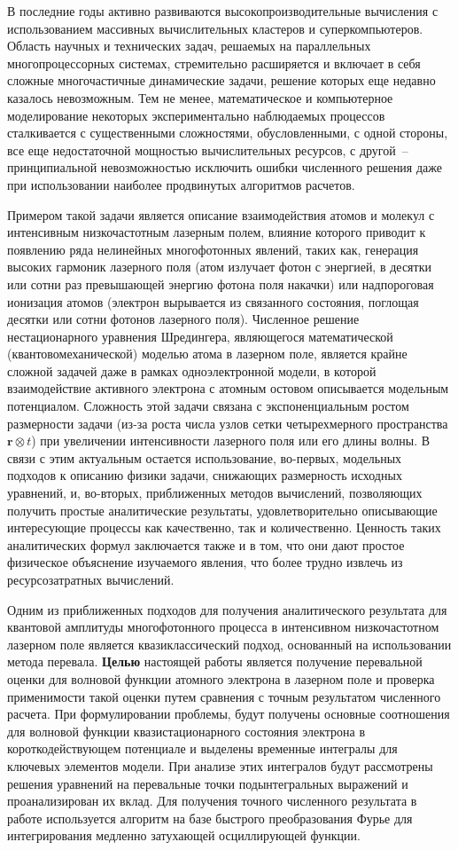 \documentclass[14pt]{extarticle}
\newcommand{\vr}{\mathbf{r}}
\begin{document}
В последние годы активно развиваются высокопроизводительные вычисления с использованием массивных вычислительных кластеров и суперкомпьютеров. Область научных и технических задач, решаемых на параллельных многопроцессорных системах, стремительно расширяется и включает в себя сложные многочастичные динамические задачи, решение которых еще недавно казалось невозможным. Тем не менее, математическое и компьютерное моделирование некоторых экспериментально наблюдаемых процессов сталкивается с существенными сложностями, обусловленными, с одной стороны, все еще недостаточной мощностью вычислительных ресурсов, с другой~-- принципиальной невозможностью исключить ошибки численного решения даже при использовании наиболее продвинутых алгоритмов расчетов.  

Примером такой задачи является описание взаимодействия атомов и молекул с интенсивным низкочастотным лазерным полем, влияние которого приводит к появлению ряда нелинейных многофотонных явлений, таких как, генерация высоких гармоник лазерного поля (атом излучает фотон с энергией, в десятки или сотни раз превышающей энергию фотона поля накачки) или надпороговая ионизация атомов (электрон вырывается из связанного состояния, поглощая десятки или сотни фотонов лазерного поля). Численное решение нестационарного уравнения Шредингера, являющегося математической (квантовомеханической) моделью атома в лазерном поле, является крайне сложной задачей даже в рамках одноэлектронной модели, в которой взаимодействие активного электрона с атомным остовом описывается модельным потенциалом. Сложность этой задачи связана с экспоненциальным ростом размерности задачи (из-за роста числа узлов сетки четырехмерного пространства $\vr\otimes t$) при увеличении интенсивности лазерного поля или его длины волны. В связи с этим актуальным остается использование, во-первых, модельных подходов к описанию физики задачи, снижающих размерность исходных уравнений, и, во-вторых, приближенных методов вычислений, позволяющих получить простые аналитические результаты, удовлетворительно описывающие интересующие процессы как качественно, так и количественно. Ценность таких аналитических формул заключается также и в том, что они дают простое физическое объяснение изучаемого явления, что более трудно извлечь из ресурсозатратных вычислений.

Одним из приближенных подходов для получения аналитического результата для квантовой амплитуды многофотонного процесса в интенсивном низкочастотном лазерном поле является квазиклассический подход, основанный на использовании метода перевала. \textbf{Целью} настоящей работы является получение перевальной оценки для волновой функции атомного электрона в лазерном поле и проверка применимости такой оценки путем сравнения с точным результатом численного расчета. При формулировании проблемы, будут получены основные соотношения для волновой функции квазистационарного состояния электрона в короткодействующем потенциале и выделены временные интегралы для ключевых элементов модели. При анализе этих интегралов будут рассмотрены решения уравнений на перевальные точки подынтегральных выражений и проанализирован их вклад. Для получения точного численного результата в работе используется алгоритм на базе быстрого преобразования Фурье для интегрирования медленно затухающей осциллирующей функции.
\end{document}
